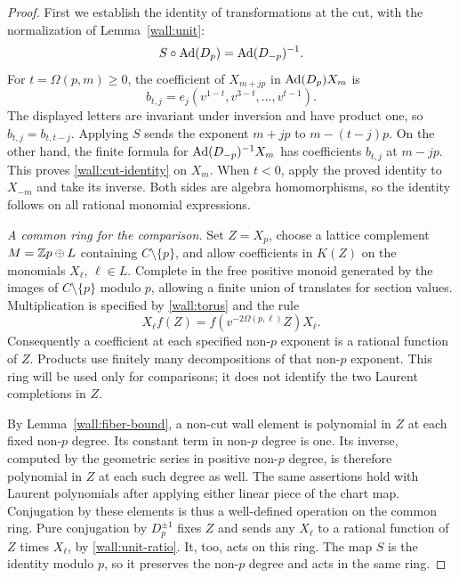 \begin{proof}
First we establish the identity of transformations at the
cut, with the normalization of Lemma~\ref{wall:unit}:
\begin{equation}
 S\circ\operatorname{Ad}(D_p)=\operatorname{Ad}(D_{-p})^{-1}.
 \label{wall:cut-identity}
\end{equation}
For $t=\Omega(p,m)\ge0$, the coefficient of $X_{m+jp}$
in $\operatorname{Ad}(D_p)X_m$ is
\[
 b_{t,j}=e_j(v^{1-t},v^{3-t},\ldots,v^{t-1}).
\]
The displayed letters are invariant under inversion and
have product one, so $b_{t,j}=b_{t,t-j}$.  Applying $S$
sends the exponent $m+jp$ to $m-(t-j)p$.
On the other hand, the finite formula for
$\operatorname{Ad}(D_{-p})^{-1}X_m$ has coefficients $b_{t,j}$ at
$m-jp$.  This proves \eqref{wall:cut-identity} on $X_m$.
When $t<0$, apply the proved identity to $X_{-m}$ and take
its inverse.  Both sides are algebra homomorphisms, so the
identity follows on all rational monomial expressions.

\emph{A common ring for the comparison.}
Set $Z=X_p$, choose a lattice complement $M=\mathbb Z p\oplus L$
containing $C\setminus\{p\}$, and allow coefficients in
$K(Z)$ on the monomials $X_\ell$, $\ell\in L$.  Complete
in the free positive monoid generated by the images of
$C\setminus\{p\}$ modulo $p$, allowing a finite union of
translates for section values.  Multiplication is specified
by \eqref{wall:torus} and the rule
\begin{equation}
 X_\ell f(Z)=f(v^{-2\Omega(p,\ell)}Z)X_\ell.
 \label{wall:rational-commutation}
\end{equation}
Consequently a coefficient at each specified non-$p$
exponent is a rational function of $Z$.  Products use
finitely many decompositions of that non-$p$ exponent.
This ring will be used only for comparisons; it does not
identify the two Laurent completions in $Z$.

By Lemma~\ref{wall:fiber-bound}, a non-cut wall element is
polynomial in $Z$ at each fixed non-$p$ degree.  Its
constant term in non-$p$ degree is one.  Its inverse,
computed by the geometric series in positive non-$p$
degree, is therefore polynomial in $Z$ at each such degree
as well.  The same assertions hold with Laurent
polynomials after applying either linear piece of the
chart map.  Conjugation by these elements is thus a
well-defined operation on the common ring.  Pure
conjugation by $D_p^{\pm1}$ fixes $Z$ and sends any
$X_\ell$ to a rational function of $Z$ times $X_\ell$,
by \eqref{wall:unit-ratio}.  It, too, acts on this ring.
The map $S$ is the identity modulo $p$, so it preserves
the non-$p$ degree and acts in the same ring.


\end{proof}
